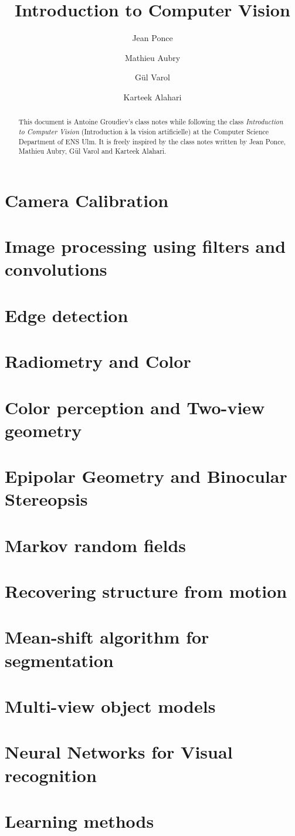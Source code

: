 \documentclass[toc, titlepaged]{../cs-classes/cs-classes}
\title{Introduction to Computer Vision}
\author{Jean Ponce\and Mathieu Aubry\and Gül Varol\and Karteek Alahari}
\begin{document}
\begin{abstract}
    This document is Antoine Groudiev's class notes while following the class \emph{Introduction to Computer Vision} (Introduction à la vision artificielle) at the Computer Science Department of ENS Ulm. It is freely inspired by the class notes written by Jean Ponce, Mathieu Aubry, Gül Varol and Karteek Alahari.
\end{abstract}



\section{Camera Calibration}

\section{Image processing using filters and convolutions}

\section{Edge detection}

\section{Radiometry and Color}

\section{Color perception and Two-view geometry}

\section{Epipolar Geometry and Binocular Stereopsis}

\section{Markov random fields}

\section{Recovering structure from motion}

\section{Mean-shift algorithm for segmentation}

\section{Multi-view object models}

\section{Neural Networks for Visual recognition}

\section{Learning methods}
\end{document}
